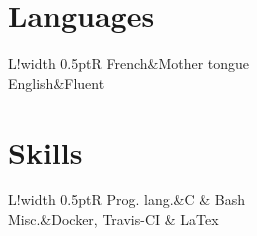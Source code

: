 \documentclass[14pt,a4paper]{article}
\newcommand\VRule{\color{lightgray}\vrule width 0.5pt}
\begin{document}
\section*{Languages}
\begin{tabular}{L!{\VRule}R}
French&Mother tongue\\[3pt]
English&Fluent\\
\end{tabular}

\section*{Skills}
\begin{tabular}{L!{\VRule}R}
Prog. lang.&C \& Bash\\
Misc.&Docker, Travis-CI \& LaTex
\end{tabular}
\end{document}
